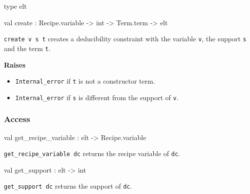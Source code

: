 \begin{ocamldocsigend}


\label{type:Constraint.Deducibility.elt}\begin{ocamldoccode}
type elt 
\end{ocamldoccode}


\label{val:Constraint.Deducibility.create}\begin{ocamldoccode}
val create : Recipe.variable -> int -> Term.term -> elt
\end{ocamldoccode}
\begin{ocamldocdescription}
{\tt{create v s t}} creates a deducibility constraint with the variable {\tt{v}}, the support {\tt{s}} and
      the term {\tt{t}}.

{\bf Raises} \begin{itemize}
\item {\tt{Internal\_error}} if {\tt{t}} is not a constructor term. \highdebug 
\item {\tt{Internal\_error}} if {\tt{s}} is different from the support of {\tt{v}}.
\end{itemize}



\end{ocamldocdescription}


\subsubsection{Access}


\label{val:Constraint.Deducibility.get-underscorerecipe-underscorevariable}\begin{ocamldoccode}
val get_recipe_variable : elt -> Recipe.variable
\end{ocamldoccode}
\begin{ocamldocdescription}
{\tt{get\_recipe\_variable dc}} returns the recipe variable of {\tt{dc}}.


\end{ocamldocdescription}


\label{val:Constraint.Deducibility.get-underscoresupport}\begin{ocamldoccode}
val get_support : elt -> int
\end{ocamldoccode}
\begin{ocamldocdescription}
{\tt{get\_support dc}} returns the support of {\tt{dc}}.



\end{ocamldocdescription}
\end{ocamldocsigend}
